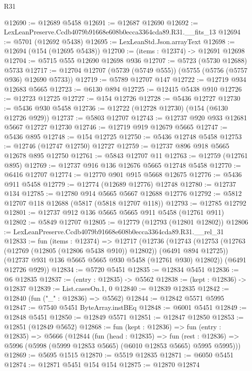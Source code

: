 \begin{lexlean}{R31}
\begin{coremodule}
@12690 := @12689 @5458
@12691 := @12687 @12690
@12692 := LexLeanPreserve.Ccdb4079b91668e608b0ecca3364cda89.R31.__fits_13
@12694 := @5701 (@12692 @5438)
@12695 := LexLeanStd.Json.arrayText
@12698 := @12694 (@154 (@12695 @5438))
@12700 := (items : @12374) -> @12691 @12698
@12704 := @5715 @555 @12690 @12698 @936
@12707 := @5723 (@5730 @12688) @5733
@12717 := @12704 @12707 (@5739 (@5749 @555)) (@5755 (@5756 (@5757 @936) @12690 @5733))
@12719 := @5789 @12707 @147
@12722 := @12719 @934 @12683 @5665
@12723 := @6130 @894
@12725 := @12415 @5438 @910
@12726 := @12723 @12725
@12727 := @154 @12726
@12728 := @5436 @12727
@12730 := @5436 @930 @5458
@12736 := @12722 (@12728 @12730) (@154 (@6130 @12726 @929))
@12737 := @5803 @12707
@12743 := @12737 @920 @933 @12681 @5667 @12727 @12730
@12746 := @12719 @919 @12679 @5665
@12747 := @5436 @895
@12748 := @154 @12725
@12750 := @5436 @12748 @5458
@12753 := @12746 (@12747 @12750) @12727
@12759 := @12737 @896 @918 @5665 @12678 @895 @12750
@12761 := @5843 @12707 @11
@12763 := @12759 (@12761 @895)
@12769 := @12737 @916 @136 @12676 @5665 @12748 @5458
@12770 := @6416 @12707
@12774 := @12770 @901 @915 @5668 @12675
@12776 := @5436 @911 @5458
@12779 := @12774 (@12689 @12776) @12748
@12780 := @12737 @134
@12785 := @12780 @914 @5665 @5667 @12688 @12776
@12792 := @5812 @12707 @118 @12688 (@5817 (@5818 @12707 @118))
@12793 := @12785 @12792
@12801 := @12737 @912 @136 @5665 @5665 @911 @5458 (@12761 @911)
@12802 := @5849 @12707
@12805 := @12779 (@12793 (@12801 @12802))
@12806 := LexLeanPreserve.Ccdb4079b91668e608b0ecca3364cda89.R31.__rel_31
@12833 := fun (items : @12374) =>
  @12717
    (@12736
      (@12743
        (@12753 (@12763 (@12769 (@12805 (@12806 @5438 @910)) @12802)) (@6491 @894 @12725))
        (@12737 @931 @136 @5665 @5665 @930 @5458 (@12761 @930) @12802))
      (@6491 @12726 @929))
@12834 := @5720 @5451
@12835 := @12834 @5451
@12836 := @6 @12835
@12837 := (entry : @12835) -> @5562
@12838 := (kept : @12836) -> @12837
@12839 := List.casesOn.{1, 0}
@12840 := @12839 @12835
@12842 := @12840 (fun ("_" : @12836) => @5562)
@12844 := @12842 @5571 @5995
@12847 := @7540 @5451 ByteArray.instBEq
@12848 := @6001 @5451
@12849 := @12848 @5451
@12850 := @12849 @5571
@12851 := @12847 @12850
@12853 := @12851 (@12849 @5652)
@12868 := fun (kept : @12836) =>
  fun (entry : @12835) =>
  @5666
    (@12844
      (fun (head : @12835) =>
      fun (rest : @12836) => @5996 (@5998 (@5999 @12853 @5665) (@6010 @12853 @5665) @5995 @5995)))
@12869 := @5695 @1515
@12870 := @5519 @12835
@12871 := @6050 @5451
@12874 := @12871 @5451 @154 @154
@12875 := @12870 @12874

\end{coremodule}
\end{lexlean}
